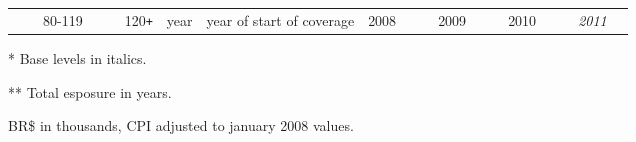 \begin{table}
\begin{threeparttable}
\begin{tabular}{lllc}
    & & 80-119 & %
    & & 120\texttt{+} & %
    \hline
    year & year of start of coverage & 2008 & %
    & & 2009 & %
    & & 2010 & %
    & & \textit{2011} & %
    \bottomrule
    \end{tabular}
    \begin{tablenotes}
    \item[*] \scriptsize{Base levels in italics.}
    \item[**] \scriptsize{Total esposure in years.}
    \item[\dag] \scriptsize{BR\$ in thousands, CPI adjusted to january 2008 values.}
    \end{tablenotes}
    \end{threeparttable}
\end{table}
